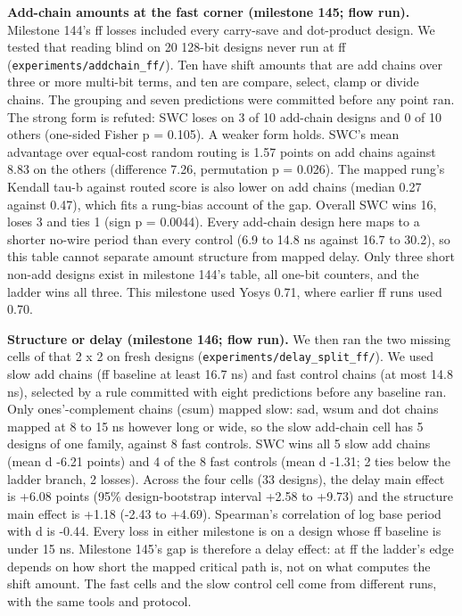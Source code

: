 \documentclass[conference]{IEEEtran}
\begin{document}
\textbf{Add-chain amounts at the fast corner (milestone 145; flow run).}
Milestone 144's ff losses included every carry-save and dot-product
design. We tested that reading blind on 20 128-bit designs never run at
ff (\texttt{experiments/\allowbreak{}addchain\_\allowbreak{}ff/\allowbreak{}}). Ten have shift amounts that are
add chains over three or more multi-bit terms, and ten are compare,
select, clamp or divide chains. The grouping and seven predictions were
committed before any point ran. The strong form is refuted: SWC loses on
3 of 10 add-chain designs and 0 of 10 others (one-sided Fisher p =
0.105). A weaker form holds. SWC's mean advantage over equal-cost random
routing is 1.57 points on add chains against 8.83 on the others
(difference 7.26, permutation p = 0.026). The mapped rung's Kendall
tau-b against routed score is also lower on add chains (median 0.27
against 0.47), which fits a rung-bias account of the gap. Overall SWC
wins 16, loses 3 and ties 1 (sign p = 0.0044). Every add-chain design
here maps to a shorter no-wire period than every control (6.9 to 14.8 ns
against 16.7 to 30.2), so this table cannot separate amount structure
from mapped delay. Only three short non-add designs exist in milestone
144's table, all one-bit counters, and the ladder wins all three. This
milestone used Yosys 0.71, where earlier ff runs used 0.70.

\textbf{Structure or delay (milestone 146; flow run).} We then ran the
two missing cells of that 2 x 2 on fresh designs
(\texttt{experiments/\allowbreak{}delay\_\allowbreak{}split\_\allowbreak{}ff/\allowbreak{}}). We used slow add chains (ff
baseline at least 16.7 ns) and fast control chains (at most 14.8 ns),
selected by a rule committed with eight predictions before any baseline
ran. Only ones'-complement chains (csum) mapped slow: sad, wsum and dot
chains mapped at 8 to 15 ns however long or wide, so the slow add-chain
cell has 5 designs of one family, against 8 fast controls. SWC wins all
5 slow add chains (mean d -6.21 points) and 4 of the 8 fast controls
(mean d -1.31; 2 ties below the ladder branch, 2 losses). Across the
four cells (33 designs), the delay main effect is +6.08 points (95\%
design-bootstrap interval +2.58 to +9.73) and the structure main effect
is +1.18 (-2.43 to +4.69). Spearman's correlation of log base period
with d is -0.44. Every loss in either milestone is on a design whose ff
baseline is under 15 ns. Milestone 145's gap is therefore a delay
effect: at ff the ladder's edge depends on how short the mapped critical
path is, not on what computes the shift amount. The fast cells and the
slow control cell come from different runs, with the same tools and
protocol.
\end{document}
